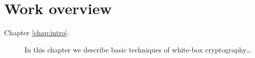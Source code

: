 \section*{Work overview}
	
	\begin{description}
		\item[Chapter \ref{chap:intro}.] In this chapter we describe basic techniques of white-box cryptography\ldots
	\end{description}
